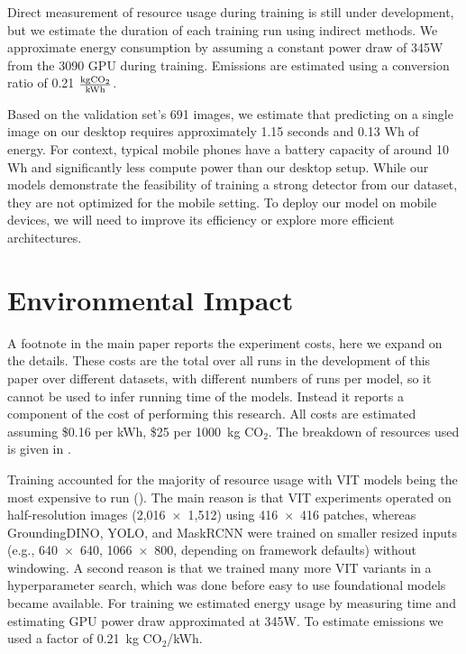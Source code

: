 Direct measurement of resource usage during training is still under development, but we estimate the
  duration of each training run using indirect methods.
We approximate energy consumption by assuming a constant power draw of 345W from the 3090 GPU during
  training.
Emissions are estimated using a conversion ratio of 0.21 $\frac{\textrm{kg}\mathrm{CO_2}{}}{\textrm{kWh}}$.
  
Based on the validation set's 691 images, we estimate that predicting on a single image on our desktop
  requires approximately 1.15 seconds and 0.13 Wh of energy.
For context, typical mobile phones have a battery capacity of around 10 Wh and significantly less compute
  power than our desktop setup.
While our models demonstrate the feasibility of training a strong detector from our dataset, they are not
  optimized for the mobile setting.
To deploy our model on mobile devices, we will need to improve its efficiency or explore more efficient
  architectures.

\section{Environmental Impact} 
\label{sec:general_environmental_impact}

A footnote in the main paper reports the experiment costs, here we expand on the details.
These costs are the total over all runs in the development of this paper over different datasets, with
  different numbers of runs per model, so it cannot be used to infer running time of the models.
Instead it reports a component of the cost of performing this research.
All costs are estimated assuming \$0.16 per kWh, \$25 per 1000~kg CO$_2$.
The breakdown of resources used is given in .

Training accounted for the majority of resource usage with VIT models being the most expensive to run
  ().
The main reason is that VIT experiments operated on half-resolution images (2,016~$\times$~1,512) using
  416~$\times$~416 patches, whereas GroundingDINO, YOLO, and MaskRCNN were trained on smaller resized inputs
  (e.g., 640~$\times$~640, 1066~$\times$~800, depending on framework defaults) without windowing.
A second reason is that we trained many more VIT variants in a hyperparameter search, which was done before
  easy to use foundational models became available.
For training we estimated energy usage by measuring time and estimating GPU power draw approximated at 345W.
To estimate emissions we used a factor of 0.21~kg CO$_2$/kWh.

